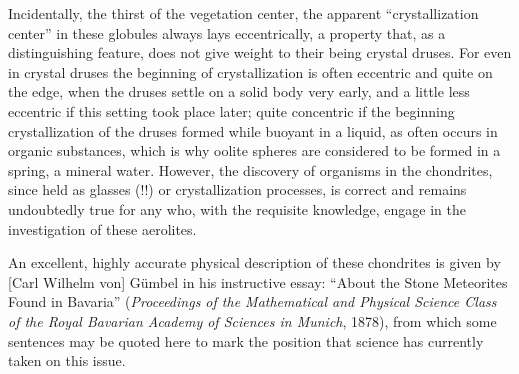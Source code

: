 \documentclass[a4paper, 12pt, oneside]{article}
\begin{document}
Incidentally, the thirst of the vegetation center, the apparent ``crystallization center'' in these globules always lays eccentrically, a property that, as a distinguishing feature, does not give weight to their being crystal druses. For even in crystal druses the beginning of crystallization is often eccentric and quite on the edge, when the druses settle on a solid body very early, and a little less eccentric if this setting took place later; quite concentric if the beginning crystallization of the druses formed while buoyant in a liquid, as often occurs in organic substances, which is why oolite spheres are considered to be formed in a spring, a mineral water. However, the discovery of organisms in the chondrites, since held as glasses (!!) or crystallization processes, is correct and remains undoubtedly true for any who, with the requisite knowledge, engage in the investigation of these aerolites.

An excellent, highly accurate physical description of these chondrites is given by [Carl Wilhelm von] Gümbel in his instructive essay: ``About the Stone Meteorites Found in Bavaria'' (\emph{Proceedings of the Mathematical and Physical Science Class of the Royal Bavarian Academy of Sciences in Munich}, 1878), from which some sentences may be quoted here to mark the position that science has currently taken on this issue.
\end{document}
